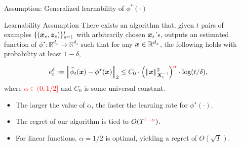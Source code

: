 \documentclass[10pt, xcolor={dvipsnames,x11names},compress]{beamer}
\begin{document}
\begin{frame}{Assumption: Generalized learnability of $\phi^*(\cdot)$}

\begin{alertblock}{Learnability Assumption}
There exists an algorithm that, given $t$ pairs of examples $\{({\bm{x}}_s, {\bm{z}}_s)\}_{s=1}^t$ with  arbitrarily chosen ${\bm{x}}_s$'s,   outputs an estimated function of $\phi^\star: \mathbb{R}^{d_x} \rightarrow \mathbb{R}^{d_z}$ such that for any ${\bm{x}}\in \mathbb{R}^{d_x}$,  the following holds with probability at least $1-\delta$, 

\begin{align}
     e_t^\delta:=\left\|\widehat{\phi}_t(\boldsymbol{x})-\phi^{\star}(\boldsymbol{x})\right\|_2 \leq C_0 \cdot\left(\|\boldsymbol{x}\|_{\boldsymbol{X}_t^{-1}}^2\right)^{\textcolor{red}{\alpha}} \cdot \log (t / \delta), \nonumber
\end{align}
where \textcolor{red}{$\alpha \in (0, 1/2]$} and $C_0$ is some universal constant. 
\end{alertblock}

\vspace{+10pt}

\begin{itemize}
    \item The larger the value of $\alpha$, the faster the learning rate for $\phi^{\star}(\cdot)$.
    \item The regret of our algorithm is tied to $O(T^{\textcolor{red}{1-\alpha}})$.
    \item For linear functions, $\alpha = 1/2$ is optimal, yielding a regret of $O(\sqrt{T})$.
\end{itemize}

\end{frame}
\end{document}
